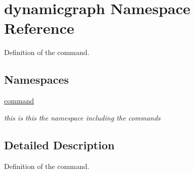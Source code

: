 \hypertarget{namespacedynamicgraph}{}\section{dynamicgraph Namespace Reference}
\label{namespacedynamicgraph}


Definition of the command.  


\subsection*{Namespaces}
\begin{DoxyCompactItemize}
\item 
 \hyperlink{namespacedynamicgraph_1_1command}{command}
\begin{DoxyCompactList}\small\item\em this is this the namespace including the commands \end{DoxyCompactList}\end{DoxyCompactItemize}


\subsection{Detailed Description}
Definition of the command. 